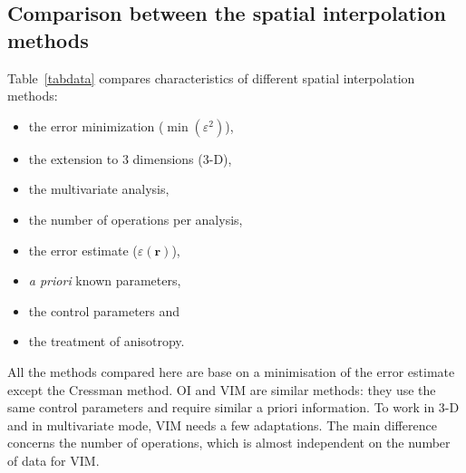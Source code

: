 \subsection{Comparison between the spatial interpolation methods}

Table~\ref{tabdata} compares characteristics of different spatial interpolation methods: 
\begin{itemize}
\item the error minimization ($\min( \varepsilon^2)$),
\item the extension to 3 dimensions (3-D), 
\item the multivariate analysis, 
\item the number of operations per analysis, 
\item the error estimate ($\varepsilon(\mathbf{r})$),
\item \textit{a priori} known parameters, 
\item the control parameters and 
\item the treatment of anisotropy. 
\end{itemize} 

All the methods compared here are base on a minimisation of the error estimate except the Cressman method. OI and VIM are similar methods: they use the same control parameters and require similar a priori information. To work in 3-D and in multivariate mode, VIM needs a few adaptations. 
The main difference concerns the number of operations, which is almost independent on the number of data for VIM.

